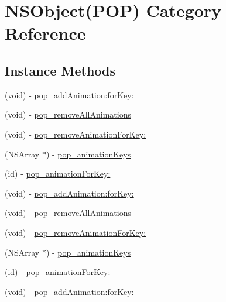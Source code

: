 \hypertarget{category_n_s_object_07_p_o_p_08}{}\section{N\+S\+Object(P\+OP) Category Reference}
\label{category_n_s_object_07_p_o_p_08}
\subsection*{Instance Methods}
\begin{DoxyCompactItemize}
\item 
(void) -\/ \mbox{\hyperlink{category_n_s_object_07_p_o_p_08_aa41ce0061104fecaceafcbc959967013}{pop\+\_\+add\+Animation\+:for\+Key\+:}}
\item 
(void) -\/ \mbox{\hyperlink{category_n_s_object_07_p_o_p_08_a8b24200d2a40751755a930f833582296}{pop\+\_\+remove\+All\+Animations}}
\item 
(void) -\/ \mbox{\hyperlink{category_n_s_object_07_p_o_p_08_a8ac27f1251e5b55eb426e829265d23b6}{pop\+\_\+remove\+Animation\+For\+Key\+:}}
\item 
(N\+S\+Array $\ast$) -\/ \mbox{\hyperlink{category_n_s_object_07_p_o_p_08_a1651078990a6428516ef74bc0eed7480}{pop\+\_\+animation\+Keys}}
\item 
(id) -\/ \mbox{\hyperlink{category_n_s_object_07_p_o_p_08_a517e269829d65c37f0541e49a3d18210}{pop\+\_\+animation\+For\+Key\+:}}
\item 
(void) -\/ \mbox{\hyperlink{category_n_s_object_07_p_o_p_08_aa41ce0061104fecaceafcbc959967013}{pop\+\_\+add\+Animation\+:for\+Key\+:}}
\item 
(void) -\/ \mbox{\hyperlink{category_n_s_object_07_p_o_p_08_a8b24200d2a40751755a930f833582296}{pop\+\_\+remove\+All\+Animations}}
\item 
(void) -\/ \mbox{\hyperlink{category_n_s_object_07_p_o_p_08_a8ac27f1251e5b55eb426e829265d23b6}{pop\+\_\+remove\+Animation\+For\+Key\+:}}
\item 
(N\+S\+Array $\ast$) -\/ \mbox{\hyperlink{category_n_s_object_07_p_o_p_08_a1651078990a6428516ef74bc0eed7480}{pop\+\_\+animation\+Keys}}
\item 
(id) -\/ \mbox{\hyperlink{category_n_s_object_07_p_o_p_08_a517e269829d65c37f0541e49a3d18210}{pop\+\_\+animation\+For\+Key\+:}}
\item 
(void) -\/ \mbox{\hyperlink{category_n_s_object_07_p_o_p_08_aa41ce0061104fecaceafcbc959967013}{pop\+\_\+add\+Animation\+:for\+Key\+:}}
\item 

\end{DoxyCompactItemize}
